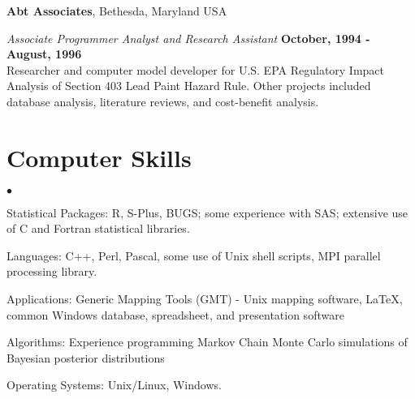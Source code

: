 \documentclass[margin,line]{res}
\newenvironment{list2}{
  \begin{list}{$\bullet$}{%
      \setlength{\itemsep}{0in}
      \setlength{\parsep}{0in} \setlength{\parskip}{0in}
      \setlength{\topsep}{0in} \setlength{\partopsep}{0in} 
      \setlength{\leftmargin}{0.2in}}}{\end{list}}
\begin{document}
\begin{resume}
{\bf Abt Associates}, Bethesda, Maryland USA

\vspace{-.3cm}
{\em Associate Programmer Analyst and Research Assistant} \hfill {\bf
  October, 1994 - August, 1996}\\
Researcher and computer model developer for U.S. EPA Regulatory Impact
Analysis of Section 403 Lead Paint Hazard Rule.  Other projects
included database analysis, literature reviews, and cost-benefit analysis.

\section{\sc Computer Skills} 
\begin{list2}
\item Statistical Packages:  R, S-Plus, BUGS; some experience
  with SAS; extensive use of C and Fortran statistical libraries.
\item Languages:  C++, Perl, Pascal, some use of Unix shell scripts,
  MPI parallel processing library.
\item Applications: Generic Mapping Tools (GMT) - Unix mapping software, \LaTeX, common Windows
  database, spreadsheet, and presentation software
\item Algorithms: Experience programming Markov Chain Monte Carlo
  simulations of Bayesian posterior distributions
\item Operating Systems:  Unix/Linux, Windows.\\ 
\end{list2}



\end{resume}
\end{document}
